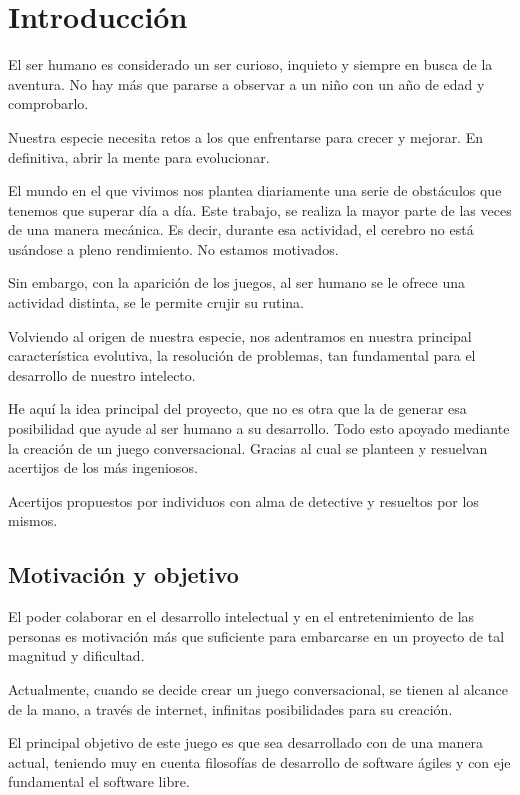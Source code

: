 \chapter{Introducción}
El ser humano es considerado un ser curioso, inquieto y siempre en busca de la aventura. No hay más que pararse a observar a un niño con un año de edad y comprobarlo.

Nuestra especie necesita retos a los que enfrentarse para crecer y mejorar. En definitiva, abrir la mente para evolucionar.

El mundo en el que vivimos nos plantea diariamente una serie de obstáculos que tenemos que superar día a día. Este trabajo, se realiza la mayor parte de las veces de una manera mecánica. Es decir, durante esa actividad, el cerebro no está usándose a pleno rendimiento. No estamos motivados.

Sin embargo, con la aparición de los juegos, al ser humano se le ofrece una actividad distinta, se le permite crujir su rutina.

Volviendo al origen de nuestra especie, nos adentramos en nuestra principal característica evolutiva, la resolución de problemas, tan fundamental para el desarrollo de nuestro intelecto.

He aquí la idea principal del proyecto, que no es otra que la de generar esa posibilidad que ayude al ser humano a su desarrollo. Todo esto apoyado mediante la creación de un juego conversacional. Gracias al cual se planteen y resuelvan acertijos de los más ingeniosos. 

Acertijos propuestos por individuos con alma de detective y resueltos por los mismos.

\section{Motivación y objetivo}

El poder colaborar en el desarrollo intelectual y en el entretenimiento de las personas es motivación más que suficiente para embarcarse en un proyecto de tal magnitud y dificultad.

Actualmente, cuando se decide crear un juego conversacional, se tienen al alcance de la mano, a través de internet, infinitas posibilidades para su creación.

El principal objetivo de este juego es que sea desarrollado con de una manera actual, teniendo muy en cuenta filosofías de desarrollo de software ágiles y con eje fundamental el software libre. 

